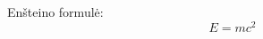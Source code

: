 \documentclass[12pt]{article}
\begin{document}
Enšteino formulė:
\begin{equation}
E=mc^2
\end{equation}
\end{document}
